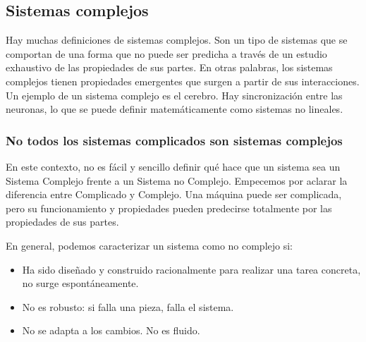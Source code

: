 \subsection{Sistemas complejos}
Hay muchas definiciones de sistemas complejos. Son un tipo de sistemas que se comportan de una forma que no puede ser predicha a través de un estudio exhaustivo de las propiedades de sus partes. En otras palabras, los sistemas complejos tienen propiedades emergentes que surgen a partir de sus interacciones. Un ejemplo de un sistema complejo es el cerebro. Hay sincronización entre las neuronas, lo que se puede definir matemáticamente como sistemas no lineales. 

\subsubsection{No todos los sistemas complicados son sistemas complejos}
En este contexto, no es fácil y sencillo definir qué hace que un sistema sea un Sistema Complejo frente a un Sistema no Complejo. Empecemos por aclarar la diferencia entre Complicado y Complejo. Una máquina puede ser complicada, pero su funcionamiento y propiedades pueden predecirse totalmente por las propiedades de sus partes.

En general, podemos caracterizar un sistema como no complejo si:
\begin{itemize}
\item Ha sido diseñado y construido racionalmente para realizar una tarea concreta, no surge espontáneamente.
\item No es robusto: si falla una pieza, falla el sistema.
\item No se adapta a los cambios. No es fluido.
\end{itemize}

